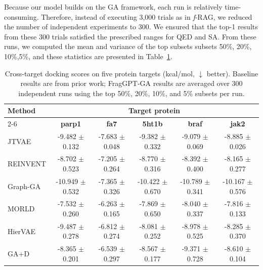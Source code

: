 \documentclass[lettersize,journal]{IEEEtran}
\begin{document}
Because our model builds on the GA framework, each run is relatively time-consuming. Therefore, instead of executing 3,000 trials as in \textit{f}‑RAG\cite{lee2024molecule}, we reduced the number of independent experiments to 300. We ensured that the top-1 results from these 300 trials satisfied the prescribed ranges for QED and SA. From these runs, we computed the mean and variance of the top subsets subsets 50\%, 20\%, 10\%,5\%, and these statistics are presented in Table~\ref{tab:target_protein_scores}.
\begin{table}[t]
    \caption{Cross-target docking scores on five protein targets (kcal/mol, \(\downarrow\) better). Baseline results are from prior work; FragGPT-GA results are averaged over 300 independent runs using the top 50\%, 20\%, 10\%, and 5\% subsets per run.}
    \label{tab:target_protein_scores}
    \centering
    \small 
    \begin{tabular}{l ccccc}
        \hline        
        \multirow{2}{*}{\textbf{Method}} & \multicolumn{5}{c}{\textbf{Target protein}} \\  
        \cline{2-6} %
        & \textbf{parp1} & \textbf{fa7} & \textbf{5ht1b} & \textbf{braf} & \textbf{jak2} \\
        \hline        
        JTVAE\cite{jinJunctionTreeVariational2018}     & -9.482 $\pm$ 0.132 & -7.683 $\pm$ 0.048 & -9.382 $\pm$ 0.332 & -9.079 $\pm$ 0.069 & -8.885 $\pm$ 0.026 \\
        REINVENT\cite{olivecronaMolecularDeNovoDesign2017}   & -8.702 $\pm$ 0.523 & -7.205 $\pm$ 0.264 & -8.770 $\pm$ 0.316 & -8.392 $\pm$ 0.400 & -8.165 $\pm$ 0.277 \\
        Graph-GA\cite{jensenGraphBasedGeneticAlgorithm2019}   & -10.949 $\pm$ 0.532 & -7.365 $\pm$ 0.326 & -10.422 $\pm$ 0.670 & -10.789 $\pm$ 0.341 & -10.167 $\pm$ 0.576 \\
        MORLD\cite{jeon2020autonomous}      & -7.532 $\pm$ 0.260 & -6.263 $\pm$ 0.165 & -7.869 $\pm$ 0.650 & -8.040 $\pm$ 0.337 & -7.816 $\pm$ 0.133 \\
        HierVAE\cite{jin2020hierarchical}    & -9.487 $\pm$ 0.278 & -6.812 $\pm$ 0.274 & -8.081 $\pm$ 0.252 & -8.978 $\pm$ 0.525 & -8.285 $\pm$ 0.370 \\
        GA+D\cite{nigamAugmentingGeneticAlgorithms2020}       & -8.365 $\pm$ 0.201 & -6.539 $\pm$ 0.297 & -8.567 $\pm$ 0.177 & -9.371 $\pm$ 0.728 & -8.610 $\pm$ 0.104 \\

\end{tabular}
\end{table}
\end{document}
